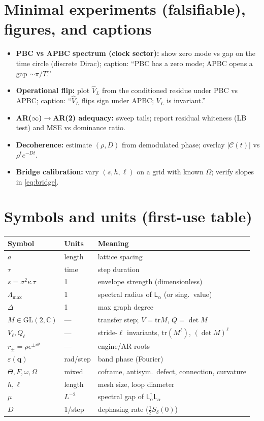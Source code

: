 \documentclass[11pt]{article}
\newcommand{\Lap}{\mathsf{L}_\alpha}
\newcommand{\Thet}{\Theta}
\begin{document}
\section{Minimal experiments (falsifiable), figures, and captions}
\begin{itemize}
\item \textbf{PBC vs APBC spectrum (clock sector):} show zero mode vs gap on the time circle (discrete Dirac); caption: “PBC has a zero mode; APBC opens a gap $\sim\pi/T$.”
\item \textbf{Operational flip:} plot $\widehat V_L$ from the conditioned residue under PBC vs APBC; caption: “$\widehat V_L$ flips sign under APBC; $V_L$ is invariant.”
\item \textbf{AR($\infty$)$\to$AR(2) adequacy:} sweep tails; report residual whiteness (LB test) and MSE vs dominance ratio.
\item \textbf{Decoherence:} estimate $(\rho,D)$ from demodulated phase; overlay $|\mathcal{C}(t)|$ vs $\rho^t e^{-Dt}$.
\item \textbf{Bridge calibration:} vary $(s,h,\ell)$ on a grid with known $\Omega$; verify slopes in \eqref{eq:bridge}.
\end{itemize}

\section{Symbols and units (first-use table)}
\begin{center}
\begin{tabular}{@{}lll@{}}
\toprule
Symbol & Units & Meaning \\
\midrule
$a$ & length & lattice spacing \\
$\tau$ & time & step duration \\
$s=\sigma^2\kappa\,\tau$ & 1 & envelope strength (dimensionless) \\
$\Lambda_{\max}$ & 1 & spectral radius of $\Lap$ (or sing.\ value) \\
$\Delta$ & 1 & max graph degree \\
$M\in\mathrm{GL}(2,\mathbb{C})$ & --- & transfer step; $V=\mathrm{tr}M$, $Q=\det M$ \\
$V_\ell, Q_\ell$ & --- & stride-$\ell$ invariants, $\mathrm{tr}(M^\ell)$, $(\det M)^\ell$ \\
$r_\pm=\rho e^{\pm i\theta}$ & --- & engine/AR roots \\
$\varepsilon(\mathbf q)$ & rad/step & band phase (Fourier) \\
$\Thet, F, \omega, \Omega$ & mixed & coframe, antisym.\ defect, connection, curvature \\
$h,\ell$ & length & mesh size, loop diameter \\
$\mu$ & $L^{-2}$ & spectral gap of $\Lap^\dagger\Lap$ \\
$D$ & 1/step & dephasing rate ($\tfrac12 S_\delta(0)$) \\
\bottomrule
\end{tabular}
\end{center}
\end{document}
